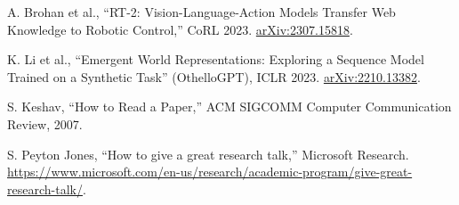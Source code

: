 \documentclass[11pt]{article}
\theoremstyle{remark}
\begin{document}
\begin{enumerate}[leftmargin=2em, label={[\arabic*]}, itemsep=2pt]
  \item A. Brohan et al., ``RT-2: Vision-Language-Action Models Transfer Web Knowledge to Robotic Control,'' CoRL 2023. \href{https://arxiv.org/abs/2307.15818}{arXiv:2307.15818}.
  \item K. Li et al., ``Emergent World Representations: Exploring a Sequence Model Trained on a Synthetic Task'' (OthelloGPT), ICLR 2023. \href{https://arxiv.org/abs/2210.13382}{arXiv:2210.13382}.
  \item S. Keshav, ``How to Read a Paper,'' ACM SIGCOMM Computer Communication Review, 2007.
  \item S. Peyton Jones, ``How to give a great research talk,'' Microsoft Research. \url{https://www.microsoft.com/en-us/research/academic-program/give-great-research-talk/}.
\end{enumerate}
\end{document}
